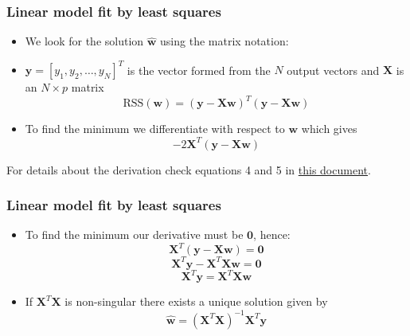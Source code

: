 \documentclass[notes]{beamer}          %
\newcommand{\vect}[1]{\bm{#1}}
\newif\iffull
\begin{document}
\begin{frame}
\frametitle{Linear model fit by least squares}
    \begin{itemize}
        \item We look for the solution $\hat{\vect{w}}$ using the matrix notation:
        \item $\vect{y} = [y_1, y_2, \ldots, y_N]^T$ is the vector formed from the $N$ output vectors and $\vect{X}$ is an $N \times p$ matrix  \\
        $$\mbox{RSS}(\vect{w}) =  (\vect{y} - \vect{X} \vect{w})^T (\vect{y} - \vect{X} \vect{w})$$
        \item To find the minimum we differentiate with respect to $\vect{w}$ which gives
        $$ -2 \vect{X}^T(\vect{y}-\vect{X}\vect{w})$$
    \end{itemize}
    
\vfill
\tiny{For details about the derivation check equations 4 and 5 in \href{https://web.stanford.edu/~mrosenfe/soc_meth_proj3/matrix_OLS_NYU_notes.pdf}{this document}.}

\end{frame}

\begin{frame}
\frametitle{Linear model fit by least squares}
    \begin{itemize}

    \item To find the minimum our derivative must be $\vect{0}$, hence:
        $$\vect{X}^T(\vect{y}-\vect{X}\vect{w}) =  \vect{0}$$
        $$\vect{X}^T \vect{y} -\vect{X}^T\vect{X}\vect{w} =  \vect{0}$$
        $$ \vect{X}^T \vect{y} = \vect{X}^T\vect{X}\vect{w}$$
    \item    If $\vect{X}^T\vect{X}$ is non-singular there exists a unique solution given by
        $$\hat{\vect{w}} = (\vect{X}^T\vect{X})^{-1}\vect{X}^T \vect{y}$$
    \end{itemize}

\end{frame}

\iffull
\begin{frame}
\frametitle{Discussion point 1}

Why we cannot simply solve for $\hat{\vect{w}}$ in the following way?

$$\vect{y} -\vect{X}\vect{w}=  \vect{0}$$ 
$$\vect{y} = \vect{X}\vect{w}$$ 
$$\hat{\vect{w}} = \vect{X}^{-1} \vect{y}$$

\end{frame}
\fi
\end{document}
